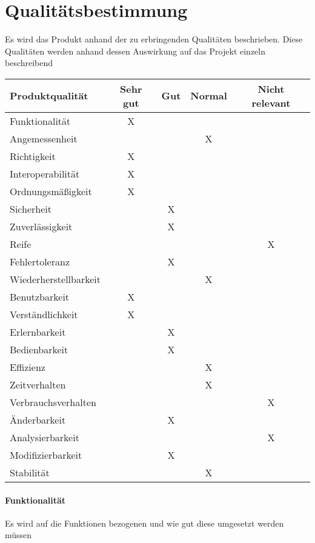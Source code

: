 \section{Qualitätsbestimmung}
Es wird das Produkt anhand der zu erbringenden Qualitäten beschrieben. Diese Qualitäten werden anhand dessen Auswirkung auf das Projekt einzeln beschreibend

\begin{table}[H]
	\begin{center}
		\begin{tabularx}{\linewidth}{|X|c|c|c|c|}
			\hline
			\textbf{Produktqualität}&Sehr gut&Gut&Normal&Nicht relevant\\
			\hline
			Funktionalität&X&&&\\
			\hline
			Angemessenheit&&&X&\\
			\hline
			Richtigkeit&X&&&\\
			\hline
			Interoperabilität&X&&&\\
			\hline
			Ordnungsmäßigkeit&X&&&\\
			\hline
			Sicherheit&&X&&\\
			\hline
			Zuverlässigkeit&&X&&\\
			\hline
			Reife&&&&X\\
			\hline
			Fehlertoleranz&&X&&\\
			\hline
			Wiederherstellbarkeit&&&X&\\
			\hline
			Benutzbarkeit&X&&&\\
			\hline
			Verständlichkeit&X&&&\\
			\hline
			Erlernbarkeit&&X&&\\
			\hline
			Bedienbarkeit&&X&&\\
			\hline
			Effizienz&&&X&\\
			\hline
			Zeitverhalten&&&X&\\
			\hline
			Verbrauchsverhalten&&&&X\\
			\hline
			Änderbarkeit&&X&&\\
			\hline
			Analysierbarkeit&&&&X\\
			\hline
			Modifizierbarkeit&&X&&\\
			\hline
			Stabilität&&&X&\\
			\hline
		\end{tabularx}
	\end{center}
\end{table}

\paragraph{Funktionalität}Es wird auf die Funktionen bezogenen und wie gut diese umgesetzt werden müssen
